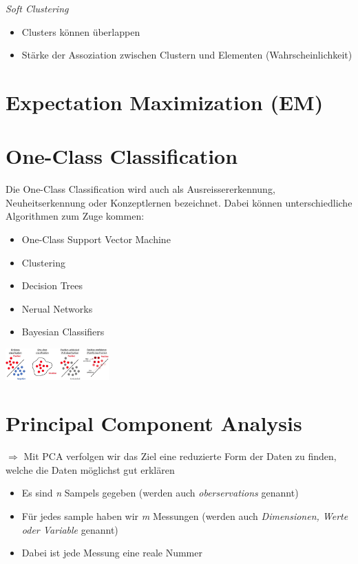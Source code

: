 \documentclass{article}
\newenvironment{Figure}
	{\par\medskip\noindent\minipage{\linewidth}}
	{\endminipage\par\medskip}
\theoremstyle{merke}
\theoremstyle{definition}
\begin{document}
        \textit{Soft Clustering}
        \begin{itemize}
            \item Clusters können überlappen
            \item Stärke der Assoziation zwischen Clustern und Elementen (Wahrscheinlichkeit)
        \end{itemize}

    \section{Expectation Maximization (EM)}


    \section{One-Class Classification}
    Die One-Class Classification wird auch als Ausreissererkennung, Neuheitserkennung oder Konzeptlernen bezeichnet. Dabei können unterschiedliche Algorithmen zum Zuge kommen:
    \begin{itemize}
        \item One-Class Support Vector Machine
        \item Clustering
        \item Decision Trees 
        \item Nerual Networks
        \item Bayesian Classifiers
    \end{itemize}
    \begin{Figure}
    \centering
    \includegraphics[width=150px]{img/ClassificationTasks.png}
        \label{fig:Überblick über die verschiedenen Classification Tasks}
    \end{Figure}

    \section{Principal Component Analysis}
    $\Rightarrow$ Mit PCA verfolgen wir das Ziel eine reduzierte Form der Daten zu finden, welche die Daten möglichst gut erklären\\
    \begin{itemize}
        \item Es sind \textit{n} Sampels gegeben (werden auch \textit{oberservations} genannt)
        \item Für jedes sample haben wir \textit{m} Messungen (werden auch \textit{Dimensionen, Werte oder Variable} genannt)
        \item Dabei ist jede Messung eine reale Nummer
    \end{itemize}
\end{document}
